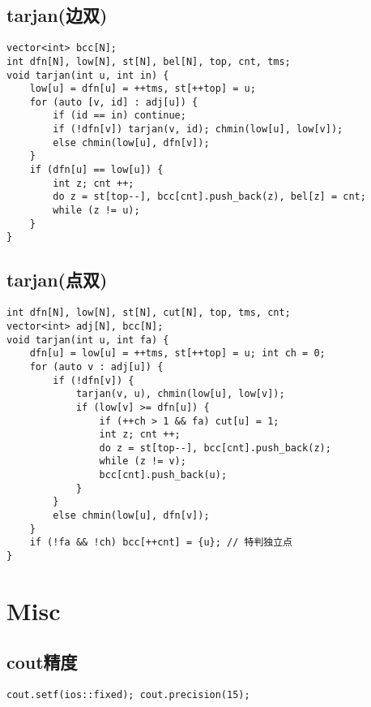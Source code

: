 \documentclass[a4paper,landscape,twocolumn]{ctexart}
\begin{document}
\subsection{tarjan(边双)}

\begin{lstlisting}
vector<int> bcc[N];
int dfn[N], low[N], st[N], bel[N], top, cnt, tms;
void tarjan(int u, int in) {
	low[u] = dfn[u] = ++tms, st[++top] = u;
	for (auto [v, id] : adj[u]) {
		if (id == in) continue;
		if (!dfn[v]) tarjan(v, id); chmin(low[u], low[v]);
		else chmin(low[u], dfn[v]);
	}
	if (dfn[u] == low[u]) {
		int z; cnt ++;
		do z = st[top--], bcc[cnt].push_back(z), bel[z] = cnt;
		while (z != u);
	}
}
\end{lstlisting}

\subsection{tarjan(点双)}

\begin{lstlisting}
int dfn[N], low[N], st[N], cut[N], top, tms, cnt;
vector<int> adj[N], bcc[N];
void tarjan(int u, int fa) {
	dfn[u] = low[u] = ++tms, st[++top] = u; int ch = 0;
	for (auto v : adj[u]) {
		if (!dfn[v]) {
			tarjan(v, u), chmin(low[u], low[v]);
			if (low[v] >= dfn[u]) {
				if (++ch > 1 && fa) cut[u] = 1;
				int z; cnt ++;
				do z = st[top--], bcc[cnt].push_back(z);
				while (z != v);
				bcc[cnt].push_back(u);
			}
		}
		else chmin(low[u], dfn[v]);
	}
	if (!fa && !ch) bcc[++cnt] = {u}; // 特判独立点
}
\end{lstlisting}

\section{Misc}

\subsection{cout精度}

\begin{lstlisting}
cout.setf(ios::fixed); cout.precision(15);
\end{lstlisting}

%
\end{document}
